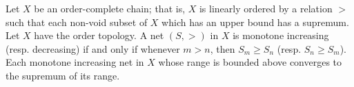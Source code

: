 Let $X$ be an order-complete chain; that is, $X$ is linearly ordered by a relation $>$ such that each non-void subset of $X$ which has an upper bound has a supremum. Let $X$ have the order topology. A net $(S, >)$ in $X$ is monotone increasing (resp. decreasing) if and only if whenever $m > n$, then $S_m \geq S_n$ (resp. $S_n \geq S_m$). Each monotone increasing net in $X$ whose range is bounded above converges to the supremum of its range.
